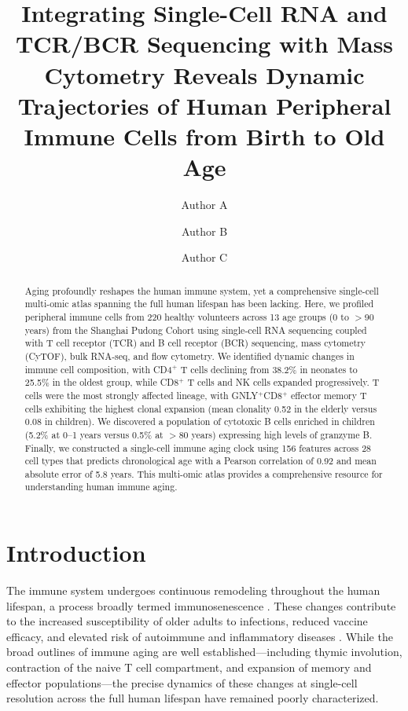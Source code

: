 \documentclass[11pt]{article}
\title{Integrating Single-Cell RNA and TCR/BCR Sequencing with Mass Cytometry Reveals Dynamic Trajectories of Human Peripheral Immune Cells from Birth to Old Age}
\author[1]{Author A}
\author[1]{Author B}
\author[1,2]{Author C}
\affil[1]{Shanghai Institute of Immunology, Shanghai Jiao Tong University School of Medicine, Shanghai, China}
\affil[2]{Department of Immunology, Pudong New Area People's Hospital, Shanghai, China}
\date{}
\begin{document}
\maketitle

\begin{abstract}
Aging profoundly reshapes the human immune system, yet a comprehensive single-cell multi-omic atlas spanning the full human lifespan has been lacking. Here, we profiled peripheral immune cells from 220 healthy volunteers across 13 age groups (0 to $>$90 years) from the Shanghai Pudong Cohort using single-cell RNA sequencing coupled with T cell receptor (TCR) and B cell receptor (BCR) sequencing, mass cytometry (CyTOF), bulk RNA-seq, and flow cytometry. We identified dynamic changes in immune cell composition, with CD4$^+$ T cells declining from 38.2\% in neonates to 25.5\% in the oldest group, while CD8$^+$ T cells and NK cells expanded progressively. T cells were the most strongly affected lineage, with GNLY$^+$CD8$^+$ effector memory T cells exhibiting the highest clonal expansion (mean clonality 0.52 in the elderly versus 0.08 in children). We discovered a population of cytotoxic B cells enriched in children (5.2\% at 0--1 years versus 0.5\% at $>$80 years) expressing high levels of granzyme B. Finally, we constructed a single-cell immune aging clock using 156 features across 28 cell types that predicts chronological age with a Pearson correlation of 0.92 and mean absolute error of 5.8 years. This multi-omic atlas provides a comprehensive resource for understanding human immune aging.
\end{abstract}

\section{Introduction}

The immune system undergoes continuous remodeling throughout the human lifespan, a process broadly termed immunosenescence \citep{nikolich2018immune}. These changes contribute to the increased susceptibility of older adults to infections, reduced vaccine efficacy, and elevated risk of autoimmune and inflammatory diseases \citep{goronzy2013understanding}. While the broad outlines of immune aging are well established---including thymic involution, contraction of the naive T cell compartment, and expansion of memory and effector populations---the precise dynamics of these changes at single-cell resolution across the full human lifespan have remained poorly characterized.
\end{document}
